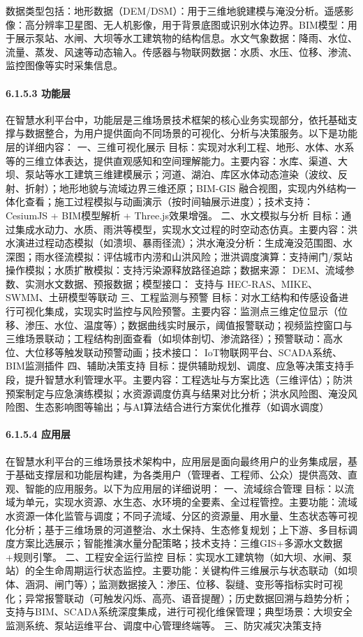 数据类型包括：地形数据（DEM/DSM）：用于三维地貌建模与淹没分析。遥感影像：高分辨率卫星图、无人机影像，用于背景底图或识别水体边界。BIM模型：用于展示泵站、水闸、大坝等水工建筑物的结构信息。水文气象数据：降雨、水位、流量、蒸发、风速等动态输入。传感器与物联网数据：水质、水压、位移、渗流、监控图像等实时采集信息。 \paragraph{6.1.5.3 功能层}\label{ux529fux80fdux5c42} 在智慧水利平台中，功能层是三维场景技术框架的核心业务实现部分，依托基础支撑与数据整合，为用户提供面向不同场景的可视化、分析与决策服务。以下是功能层的详细内容： 一、三维可视化展示 目标：实现对水利工程、地形、水体、水系等的三维立体表达，提供直观感知和空间理解能力。主要内容：水库、渠道、大坝、泵站等水工建筑三维建模展示；河道、湖泊、库区水体动态渲染（波纹、反射、折射）；地形地貌与流域边界三维还原；BIM-GIS 融合视图，实现内外结构一体化查看；施工过程模拟与动画演示（按时间轴展示进度）；技术支持： CesiumJS + BIM模型解析 + Three.js效果增强。 二、水文模拟与分析 目标：通过集成水动力、水质、雨洪等模型，实现水文过程的时空动态仿真。主要内容：洪水演进过程动态模拟（如溃坝、暴雨径流）；洪水淹没分析：生成淹没范围图、水深图；雨水径流模拟：评估城市内涝和山洪风险；泄洪调度演算：支持闸门/泵站操作模拟；水质扩散模拟：支持污染源释放路径追踪；数据来源： DEM、流域参数、实测水文数据、预报数据；模型接口： 支持与 HEC-RAS、MIKE、SWMM、土研模型等联动 三、工程监测与预警 目标：对水工结构和传感设备进行可视化集成，实现实时监控与风险预警。主要内容：监测点三维定位显示（位移、渗压、水位、温度等）；数据曲线实时展示，阈值报警联动；视频监控窗口与三维场景联动；工程结构剖面查看（如坝体剖切、渗流路径）；预警联动：高水位、大位移等触发联动预警动画；技术接口： IoT物联网平台、SCADA系统、BIM监测插件 四、辅助决策支持 目标：提供辅助规划、调度、应急等决策支持手段，提升智慧水利管理水平。主要内容：工程选址与方案比选（三维评估）；防洪预案制定与应急演练模拟；水资源调度仿真与结果对比分析；洪水风险图、淹没风险图、生态影响图等输出；与AI算法结合进行方案优化推荐（如调水调度） \paragraph{6.1.5.4 应用层}\label{ux5e94ux7528ux5c42} 在智慧水利平台的三维场景技术架构中，应用层是面向最终用户的业务集成层，基于基础支撑层和功能层构建，为各类用户（管理者、工程师、公众）提供高效、直观、智能的应用服务。以下为应用层的详细说明： 一、流域综合管理 目标：以流域为单元，实现水资源、水生态、水环境的全要素、全过程管控。主要功能：流域水资源一体化监管与调度；不同子流域、分区的资源量、用水量、生态状态等可视化分析；基于三维场景的河道整治、水土保持、生态修复规划；上下游、多目标调度方案比选展示；智能推演水量分配策略；技术支持：三维GIS+多源水文数据+规则引擎。 二、工程安全运行监控 目标：实现水工建筑物（如大坝、水闸、泵站）的全生命周期运行状态监控。主要功能：关键构件三维展示与状态联动（如坝体、涵洞、闸门等）；监测数据接入：渗压、位移、裂缝、变形等指标实时可视化；异常报警联动（可触发闪烁、高亮、语音提醒）；历史数据回溯与趋势分析；支持与BIM、SCADA系统深度集成，进行可视化维保管理；典型场景：大坝安全监测系统、泵站运维平台、调度中心管理终端等。 三、防灾减灾决策支持 